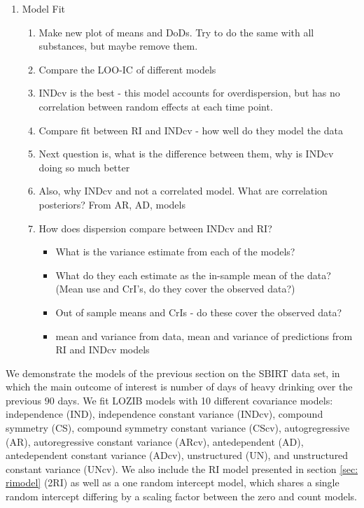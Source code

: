 \documentclass[12pt]{article}
\begin{document}
\begin{enumerate}
	\item Model Fit
	\begin{enumerate}
		\item Make new plot of means and DoDs. Try to do the same with all substances, but maybe remove them.
		\item Compare the LOO-IC of different models\\
		\item INDcv is the best - this model accounts for overdispersion, but has no correlation between random effects at each time point.\\
		\item Compare fit between RI and INDcv - how well do they model the data\\
		\item Next question is, what is the difference between them, why is INDcv doing so much better
		\item Also, why INDcv and not a correlated model. What are correlation posteriors? From AR, AD, models
		\item How does dispersion compare between INDcv and RI?
		\begin{itemize}
			\item What is the variance estimate from each of the models?
			\item What do they each estimate as the in-sample mean of the data? (Mean use and CrI's, do they cover the observed data?)\\
			\item Out of sample means and CrIs - do these cover the observed data?
			\item mean and variance from data, mean and variance of predictions from RI and INDcv models
		\end{itemize}
	\end{enumerate}
\end{enumerate}

We demonstrate the models of the previous section on the SBIRT data set, in which the main outcome of interest is number of days of heavy drinking over the previous $90$ days. We fit LOZIB models with 10 different covariance models: independence (IND), independence constant variance (INDcv), compound symmetry (CS), compound symmetry constant variance (CScv), autogregressive (AR), autoregressive constant variance (ARcv), antedependent (AD), antedependent constant variance (ADcv), unstructured (UN), and unstructured constant variance (UNcv). We also include the RI model presented in section \ref{sec: rimodel} (2RI) as well as a one random intercept model, which shares a single random intercept differing by a scaling factor between the zero and count models.
\end{document}
